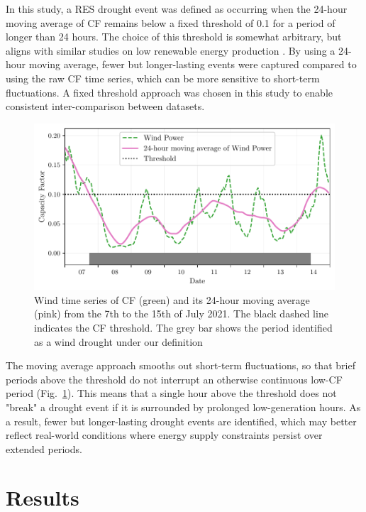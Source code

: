 \documentclass[preprint, 12pt, authoryear]{elsarticle}
\begin{document}
In this study, a RES drought event was defined as occurring when the 24-hour moving average of CF remains below a fixed threshold of 0.1 for a period of longer than 24 hours. The choice of this threshold is somewhat arbitrary, but aligns with similar studies on low renewable energy production \citep{kaspar2019drought, ohba2022drought, mayer2023drought}. By using a 24-hour moving average, fewer but longer-lasting events were captured compared to using the raw CF time series, which can be more sensitive to short-term fluctuations. A fixed threshold approach was chosen in this study to enable consistent inter-comparison between datasets.

\begin{figure}[ht!]
	\centering
	\includegraphics[width=\textwidth]{droughts_methodology.pdf}
	\caption{Wind time series of CF (green) and its 24-hour moving average (pink) from the 7th to the 15th of July 2021. The black dashed line indicates the CF threshold. The grey bar shows the period identified as a wind drought under our definition}
	\label{fig:find_res_droughts}
\end{figure}

The moving average approach smooths out short-term fluctuations, so that brief periods above the threshold do not interrupt an otherwise continuous low-CF period (Fig.~\ref{fig:find_res_droughts}). This means that a single hour above the threshold does not "break" a drought event if it is surrounded by prolonged low-generation hours. As a result, fewer but longer-lasting drought events are identified, which may better reflect real-world conditions where energy supply constraints persist over extended periods.

\section{Results}
\label{sec:Results}
\end{document}

